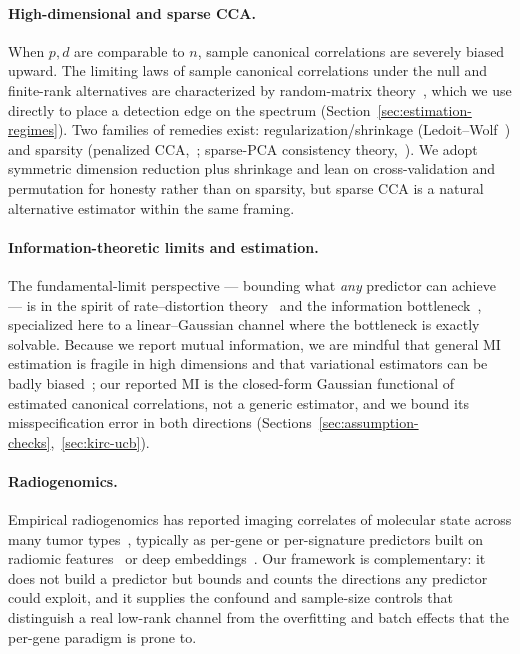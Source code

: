 \documentclass{article}
\begin{document}
\paragraph{High-dimensional and sparse CCA.}
When $p,d$ are comparable to $n$, sample canonical correlations are severely
biased upward. The limiting laws of sample canonical correlations under the null
and finite-rank alternatives are characterized by random-matrix
theory~\citep{wachter1980limiting,yang2015independence,bao2019cca}, which we use
directly to place a detection edge on the spectrum
(Section~\ref{sec:estimation-regimes}). Two families of remedies exist:
regularization/shrinkage (Ledoit--Wolf~\citep{ledoit2004shrinkage}) and sparsity
(penalized CCA,~\citealp{witten2009sparsecca}; sparse-PCA consistency
theory,~\citealp{johnstone2009pca}). We adopt symmetric dimension reduction plus
shrinkage and lean on cross-validation and permutation for honesty rather than on
sparsity, but sparse CCA is a natural alternative estimator within the same
framing.

\paragraph{Information-theoretic limits and estimation.}
The fundamental-limit perspective --- bounding what \emph{any} predictor can
achieve --- is in the spirit of rate--distortion theory~\citep{berger1971rate}
and the information bottleneck~\citep{tishby1999ib,chechik2005gaussianib,tishby2015deep},
specialized here to a linear--Gaussian channel where the bottleneck is exactly
solvable. Because we report mutual information, we are mindful that general MI
estimation is fragile in high dimensions and that variational estimators can be
badly biased~\citep{mcallester2020stratos,kraskov2004mi,belghazi2018mine}; our
reported MI is the closed-form Gaussian functional of estimated canonical
correlations, not a generic estimator, and we bound its misspecification error in
both directions (Sections~\ref{sec:assumption-checks},~\ref{sec:kirc-ucb}).

\paragraph{Radiogenomics.}
Empirical radiogenomics has reported imaging correlates of molecular state across
many tumor types~\citep{gevaert2012nsclc,jamshidi2015ccrcc,karlo2014ccrcc,shinagare2015ccrcc,udayakumar2024radiogenomic,bi2019ai,hosny2018ai},
typically as per-gene or per-signature predictors built on radiomic
features~\citep{lambin2012radiomics,aerts2014radiomics,vangriethuysen2017pyradiomics}
or deep embeddings~\citep{mei2022radimagenet}. Our framework is complementary: it
does not build a predictor but bounds and counts the directions any predictor
could exploit, and it supplies the confound and sample-size controls that
distinguish a real low-rank channel from the overfitting and batch effects that
the per-gene paradigm is prone to.
\end{document}

